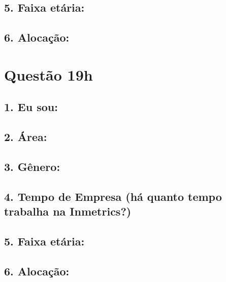 \documentclass[]{book}
\begin{document}
\hypertarget{faixa-etaria-51}{%
\subsection{5. Faixa etária:}\label{faixa-etaria-51}}

\hypertarget{alocacao-51}{%
\subsection{6. Alocação:}\label{alocacao-51}}

\hypertarget{questao-19h}{%
\section{Questão 19h}\label{questao-19h}}

\hypertarget{eu-sou-52}{%
\subsection{1. Eu sou:}\label{eu-sou-52}}

\hypertarget{area-52}{%
\subsection{2. Área:}\label{area-52}}

\hypertarget{genero-52}{%
\subsection{3. Gênero:}\label{genero-52}}

\hypertarget{tempo-de-empresa-ha-quanto-tempo-trabalha-na-inmetrics-52}{%
\subsection{4. Tempo de Empresa (há quanto tempo trabalha na Inmetrics?)}\label{tempo-de-empresa-ha-quanto-tempo-trabalha-na-inmetrics-52}}

\hypertarget{faixa-etaria-52}{%
\subsection{5. Faixa etária:}\label{faixa-etaria-52}}

\hypertarget{alocacao-52}{%
\subsection{6. Alocação:}\label{alocacao-52}}
\end{document}
